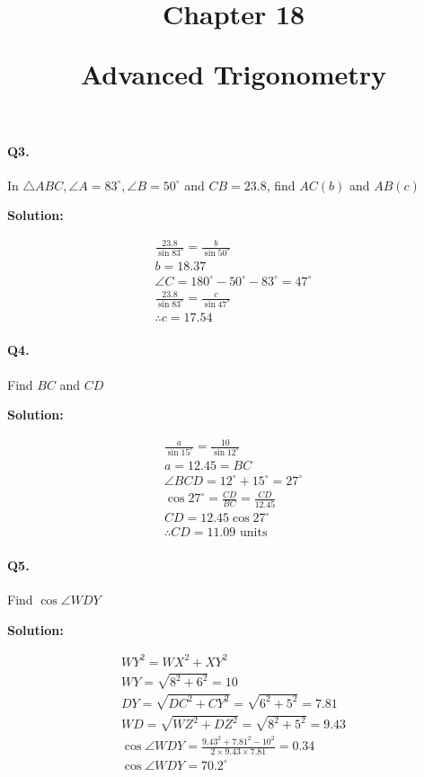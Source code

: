 \documentclass{article}
\title{Chapter 18

  Advanced Trigonometry}
\date{}
\begin{document}
\paragraph{Q3.}
In $\triangle ABC, \angle A = 83^{\circ}, \angle B= 50^{\circ}$ and $CB=23.8$, find $AC(b)$ and $AB(c)$

{\scriptsize \textbf{Solution:}}

\[
  \begin{aligned}
    \frac{23.8}{\sin 83^{\circ}} = \frac{b}{\sin 50^{\circ}} \\
    b = 18.37 \\
    \angle C = 180^{\circ}-50^{\circ}-83^{\circ}=47^{\circ} \\
    \frac{23.8}{\sin 83^{\circ}} = \frac{c}{\sin 47^{\circ}} \\
    \therefore c = 17.54
  \end{aligned}
\]

\paragraph{Q4.}
Find $BC$ and $CD$

{\scriptsize \textbf{Solution:}}

\[
  \begin{aligned}
    \frac{a}{\sin 15^{\circ}} = \frac{10}{\sin 12^{\circ}} \\
    a = 12.45 = BC \\
    \angle BCD = 12^{\circ}+15^{\circ}=27^{\circ} \\
    \cos 27^{\circ} = \frac{CD}{BC} = \frac{CD}{12.45} \\
    CD = 12.45 \cos 27^{\circ} \\
    \therefore CD = 11.09 \text{ units}
  \end{aligned}
\]

\paragraph{Q5.}
Find $\cos \angle WDY$

{\scriptsize \textbf{Solution:}}

\[
  \begin{aligned}
    WY^{2} = WX^{2} + XY^{2} \\
    WY = \sqrt{8^{2}+6^{2}} = 10 \\
    DY = \sqrt{DC^{2}+CY^{2}} = \sqrt{6^{2}+5^{2}} = 7.81 \\
    WD = \sqrt{WZ^{2}+DZ^{2}} = \sqrt{8^{2}+5^{2}} = 9.43 \\
    \cos \angle WDY = \frac{9.43^{2}+7.81^{2}-10^{2}}{2\times9.43\times7.81} = 0.34 \\
    \cos \angle WDY = 70.2^{\circ}
  \end{aligned}
\]
\end{document}
